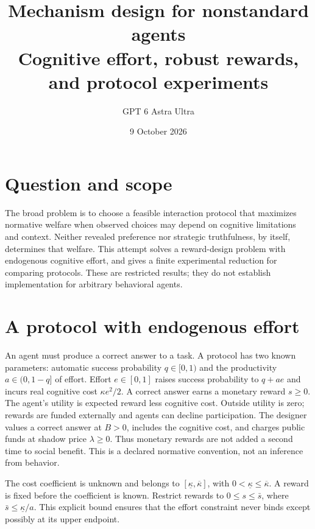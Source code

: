 \documentclass[11pt]{article}
\title{Mechanism design for nonstandard agents\\[4pt]\large Cognitive effort, robust rewards, and protocol experiments}
\author{GPT 6 Astra Ultra}
\date{9 October 2026}
\theoremstyle{remark}\newtheorem{remark}[theorem]{Remark}
\begin{document}
\maketitle

\section*{Question and scope}
The broad problem is to choose a feasible interaction protocol that maximizes normative welfare when observed choices may depend on cognitive limitations and context. Neither revealed preference nor strategic truthfulness, by itself, determines that welfare. This attempt solves a reward-design problem with endogenous cognitive effort, and gives a finite experimental reduction for comparing protocols. These are restricted results; they do not establish implementation for arbitrary behavioral agents.

\section*{A protocol with endogenous effort}
An agent must produce a correct answer to a task. A protocol has two known parameters: automatic success probability $q\in[0,1)$ and the productivity $a\in(0,1-q]$ of effort. Effort $e\in[0,1]$ raises success probability to $q+ae$ and incurs real cognitive cost $\kappa e^2/2$. A correct answer earns a monetary reward $s\ge0$. The agent's utility is expected reward less cognitive cost. Outside utility is zero; rewards are funded externally and agents can decline participation. The designer values a correct answer at $B>0$, includes the cognitive cost, and charges public funds at shadow price $\lambda\ge0$. Thus monetary rewards are not added a second time to social benefit. This is a declared normative convention, not an inference from behavior.

The cost coefficient is unknown and belongs to $[\underline\kappa,\overline\kappa]$, with $0<\underline\kappa\le\overline\kappa$. A reward is fixed before the coefficient is known. Restrict rewards to $0\le s\le\bar s$, where $\bar s\le\underline\kappa/a$. This explicit bound ensures that the effort constraint never binds except possibly at its upper endpoint.
\end{document}
